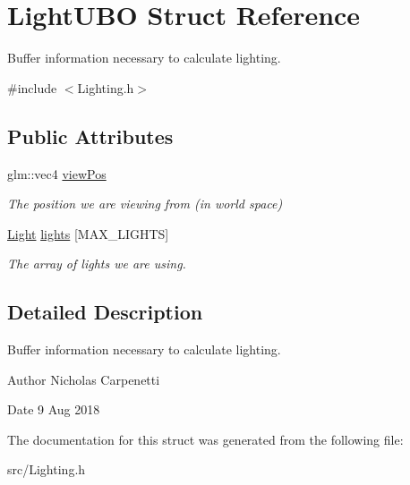 \hypertarget{struct_light_u_b_o}{}\section{Light\+U\+BO Struct Reference}
\label{struct_light_u_b_o}


Buffer information necessary to calculate lighting.  




{\ttfamily \#include $<$Lighting.\+h$>$}

\subsection*{Public Attributes}
\begin{DoxyCompactItemize}
\item 
\mbox{\label{struct_light_u_b_o_aaa2260982a7c3756a36a7335cd4ded6a}} 
glm\+::vec4 \mbox{\hyperlink{struct_light_u_b_o_aaa2260982a7c3756a36a7335cd4ded6a}{view\+Pos}}
\begin{DoxyCompactList}\small\item\em The position we are viewing from (in world space) \end{DoxyCompactList}\item 
\mbox{\label{struct_light_u_b_o_a6bcf4854ca94b0523a55df0d4f7cac10}} 
\mbox{\hyperlink{struct_light}{Light}} \mbox{\hyperlink{struct_light_u_b_o_a6bcf4854ca94b0523a55df0d4f7cac10}{lights}} \mbox{[}M\+A\+X\+\_\+\+L\+I\+G\+H\+TS\mbox{]}
\begin{DoxyCompactList}\small\item\em The array of lights we are using. \end{DoxyCompactList}\end{DoxyCompactItemize}


\subsection{Detailed Description}
Buffer information necessary to calculate lighting. 

\begin{DoxyAuthor}{Author}
Nicholas Carpenetti
\end{DoxyAuthor}
\begin{DoxyDate}{Date}
9 Aug 2018 
\end{DoxyDate}


The documentation for this struct was generated from the following file\+:\begin{DoxyCompactItemize}
\item 
src/Lighting.\+h\end{DoxyCompactItemize}
